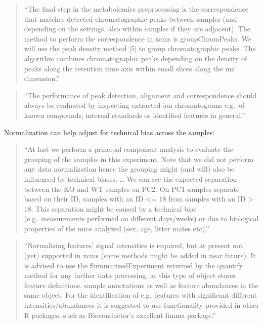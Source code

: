 \documentclass[]{tufte-book}
\begin{document}
\begin{quote}
``The final step in the metabolomics preprocessing is the correspondence that matches detected chromatographic peaks between samples (and depending on the settings, also within samples if they are adjacent). The method to perform the correspondence in xcms is groupChromPeaks. We will use the peak density method {[}5{]} to group chromatographic peaks. The algorithm combines chromatographic peaks depending on the density of peaks along the retention time axis within small slices along the mz dimension.'' \citep{smith2013lc}
\end{quote}

\begin{quote}
``The performance of peak detection, alignment and correspondence should always be evaluated by inspecting extracted ion chromatograms e.g.~of known compounds, internal standards or identified features in general.'' \citep{smith2013lc}
\end{quote}

Normalization can help adjust for technical bias across the samples:

\begin{quote}
``At last we perform a principal component analysis to evaluate the grouping of the samples in this experiment. Note that we did not perform any data normalization hence the grouping might (and will) also be influenced by technical biases. \ldots{} We can see the expected separation between the KO and WT samples on PC2. On PC1 samples separate based on their ID, samples with an ID \textless= 18 from samples with an ID \textgreater{} 18. This separation might be caused by a technical bias (e.g.~measurements performed on different days/weeks) or due to biological properties of the mice analyzed (sex, age, litter mates etc).'' \citep{smith2013lc}
\end{quote}

\begin{quote}
``Normalizing features' signal intensities is required, but at present not (yet) supported in xcms (some methods might be added in near future). It is advised to use the SummarizedExperiment returned by the quantify method for any further data processing, as this type of object stores feature definitions, sample annotations as well as feature abundances in the same object. For the identification of e.g.~features with significant different intensities/abundances it is suggested to use functionality provided in other R packages, such as Bioconductor's excellent limma package.'' \citep{smith2013lc}
\end{quote}
\end{document}
